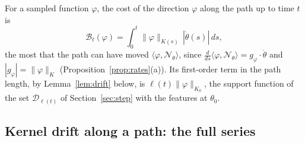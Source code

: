 \documentclass[11pt]{article}
\theoremstyle{definition}
\theoremstyle{remark}
\newcommand{\Net}{\mathcal{N}_\theta}    %
\newcommand{\ip}[2]{\langle #1,#2\rangle}
\newcommand{\cost}{\mathcal{B}}          %
\begin{document}
For a sampled function $\varphi$, the cost of the direction $\varphi$ along the path up to time $t$ is
\begin{equation}\label{eq:cost}
\cost_t(\varphi) = \int_0^t\|\varphi\|_{K(s)}\,|\dot\theta(s)|\,ds ,
\end{equation}
the most that the path can have moved $\ip{\varphi}{\Net}$, since $\frac{d}{ds}\ip{\varphi}{\Net} = g_\varphi\cdot\dot\theta$ and $|g_\varphi| = \|\varphi\|_K$ (Proposition~\ref{prop:rates}(a)).
Its first-order term in the path length, by Lemma~\ref{lem:drift} below, is $\ell(t)\|\varphi\|_{K_0}$, the support function of the set $\mathcal{D}_{\ell(t)}$ of Section~\ref{sec:step} with the features at $\theta_0$.

\subsection{Kernel drift along a path: the full series}
\end{document}
